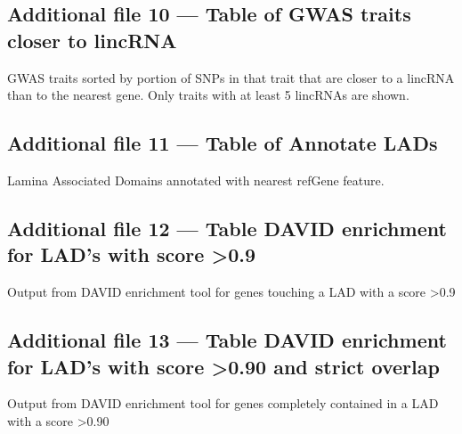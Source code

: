 \documentclass[10pt]{bmc_article}
\newenvironment{bmcformat}{\baselineskip20pt\sloppy\setboolean{publ}{false}}{\baselineskip20pt\sloppy}
\begin{document}
\begin{bmcformat}
  \subsection*{Additional file 10 --- Table of GWAS traits closer to lincRNA}
  GWAS traits sorted by portion of SNPs in that trait that are closer to a lincRNA than to the nearest
  gene. Only traits with at least 5 lincRNAs are shown.

  \subsection*{Additional file 11 --- Table of Annotate LADs}
  Lamina Associated Domains annotated with nearest refGene feature.

  \subsection*{Additional file 12 --- Table DAVID enrichment for LAD's with score \textgreater 0.9}
  Output from DAVID enrichment tool for genes touching a LAD with a score \textgreater 0.9

  \subsection*{Additional file 13 --- Table DAVID enrichment for LAD's with score \textgreater 0.90 and strict overlap}
  Output from DAVID enrichment tool for genes completely contained in a LAD with a score \textgreater 0.90

\end{bmcformat}
\end{document}
